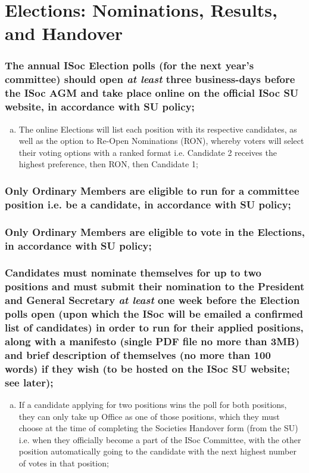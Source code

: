 \documentclass[12pt]{article}
\begin{document}
\section{Elections: Nominations, Results, and Handover}
\subsubsection{The annual ISoc Election polls (for the next year's committee) should open \emph{at least} three business-days before the ISoc AGM and take place online on the official ISoc SU website, in accordance with SU policy;}
\begin{displayquote}
\begin{enumerate}[a.]
\item The online Elections will list each position with its respective candidates, as well as the option to Re-Open Nominations (RON), whereby voters will select their voting options with a ranked format i.e. Candidate 2 receives the highest preference, then RON, then Candidate 1;
\end{enumerate}
\end{displayquote}
\subsubsection{Only Ordinary Members are eligible to run for a committee position i.e. be a candidate, in accordance with SU policy;}
\subsubsection{Only Ordinary Members are eligible to vote in the Elections, in accordance with SU policy;}
\subsubsection{Candidates must nominate themselves for up to two positions and must submit their nomination to the President and General Secretary \emph{at least} one week before the Election polls open (upon which the ISoc will be emailed a confirmed list of candidates) in order to run for their applied positions, along with a manifesto (single PDF file no more than 3MB) and brief description of themselves (no more than 100 words) if they wish (to be hosted on the ISoc SU website; see later);}
\begin{displayquote}
\begin{enumerate}[a.]
\item If a candidate applying for two positions wins the poll for both positions, they can only take up Office as one of those positions, which they must choose at the time of completing the Societies Handover form (from the SU) i.e. when they officially become a part of the ISoc Committee, with the other position automatically going to the candidate with the next highest number of votes in that position;
\end{enumerate}
\end{displayquote}
\end{document}
